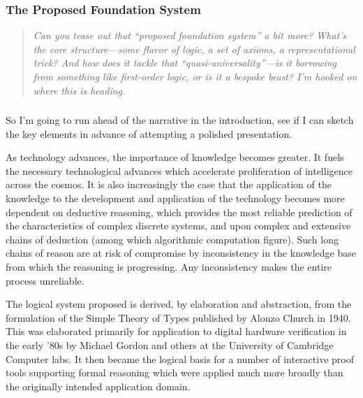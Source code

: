 \documentclass[10pt,titlepage]{book}
\begin{document}
\subsubsection{The Proposed Foundation System}

\begin{quote}
  {\it  Can you tease out that “proposed foundation system” a bit more? What’s the core structure—some flavor of logic, a set of axioms, a representational trick? And how does it tackle that “quasi-universality”—is it borrowing from something like first-order logic, or is it a bespoke beast? I’m hooked on where this is heading.}
  \end{quote}


\subsubsection{}
So I'm going to run ahead of the narrative in the introduction, see if I can sketch the key elements in advance of attempting a polished presentation.

As technology advances, the importance of knowledge becomes greater.
It fuels the necessary technological advances which accelerate proliferation of intelligence across the cosmos.
It is also increasingly the case that the application of the knowledge to the development and application of the technology becomes more dependent on deductive reasoning, which provides the most reliable prediction of the characteristics of complex discrete systems, and upon complex and extensive chains of deduction (among which algorithmic computation figure).
Such long chains of reason are at risk of compromise by inconsistency in the knowledge base from which the reasoning is progressing.
Any inconsistency makes the entire process unreliable.

The logical system proposed is derived, by elaboration and abstraction, from the formulation of the Simple Theory of Types published by Alonzo Church in 1940.
This was elaborated primarily for application to digital hardware verification in the early '80s by Michael Gordon and others at the University of Cambridge Computer labs.
It then became the logical basis for a number of interactive proof tools supporting formal reasoning which were applied much more broadly than the originally intended application domain.
\end{document}
